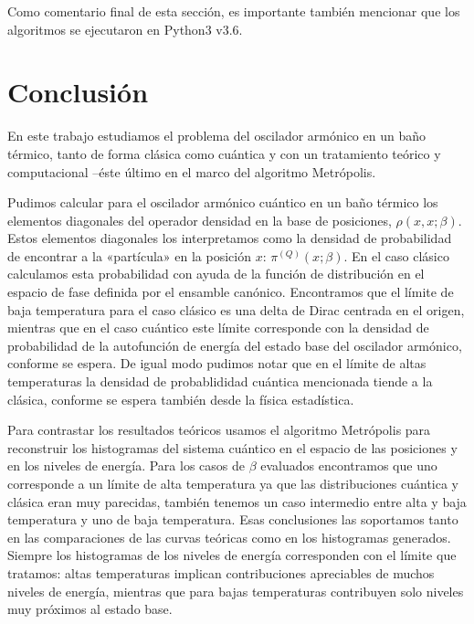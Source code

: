 \documentclass[%
 reprint,
 amsmath,amssymb,
 aps,
 pra,
]{revtex4-2}
\begin{document}
\begin{figure*}[!ht]
	\centering
	\texttt{[image: \{\{figures/pi\_x-pi-plots-harmonic\_potential-beta\_4.000-N\_path\_10-N\_iter\_1000000-delta\_0.500-append\_every\_1-x\_max\_3.000]}}}
	\caption{\hl{caption}}
\end{figure*}



Como comentario final de esta sección, es importante también mencionar que los algoritmos se ejecutaron en Python3 v3.6.

\section{Conclusión\label{sec:conclusion}}

En este trabajo estudiamos el problema del oscilador armónico en un baño térmico, tanto de forma clásica como cuántica y con un tratamiento teórico y computacional –éste último en el marco del algoritmo Metrópolis.

Pudimos calcular para el oscilador armónico cuántico en un baño térmico los elementos diagonales del operador densidad en la base de posiciones, $\rho(x,x;\beta)$. Estos elementos diagonales los interpretamos como la densidad de probabilidad de encontrar a la «partícula» en la posición $x$: $\pi^{(Q)}(x;\beta)$. En el caso clásico calculamos esta probabilidad con ayuda de la función de distribución en el espacio de fase definida por el ensamble canónico. Encontramos que el límite de baja temperatura para el caso clásico es una delta de Dirac centrada en el origen, mientras que en el caso cuántico este límite corresponde con la densidad de probabilidad de la autofunción de energía del estado base del oscilador armónico, conforme se espera. De igual modo pudimos notar que en el límite de altas temperaturas la densidad de probablididad cuántica mencionada tiende a la clásica, conforme se espera también desde la física estadística. 

Para contrastar los resultados teóricos usamos el algoritmo Metrópolis para reconstruir los histogramas del sistema cuántico en el espacio de las posiciones y en los niveles de energía. Para los casos de $\beta$ evaluados encontramos que uno corresponde a un límite de alta temperatura ya que las distribuciones cuántica y clásica eran muy parecidas, también tenemos un caso intermedio entre alta y baja temperatura y uno de baja temperatura. Esas conclusiones las soportamos tanto en las comparaciones de las curvas teóricas como en los histogramas generados. Siempre los histogramas de los niveles de energía corresponden con el límite que tratamos: altas temperaturas implican contribuciones apreciables de muchos niveles de energía, mientras que para bajas temperaturas contribuyen solo niveles muy próximos al estado base.
\end{document}
